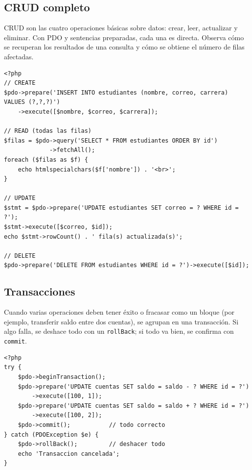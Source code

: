 \documentclass[11pt]{article}
\begin{document}
\subsection{CRUD completo}
CRUD son las cuatro operaciones básicas sobre datos: crear, leer, actualizar y eliminar. Con PDO y sentencias preparadas, cada una es directa. Observa cómo se recuperan los resultados de una consulta y cómo se obtiene el número de filas afectadas.

\begin{cajacodigo}
\begin{lstlisting}[style=php]
<?php
// CREATE
$pdo->prepare('INSERT INTO estudiantes (nombre, correo, carrera) VALUES (?,?,?)')
    ->execute([$nombre, $correo, $carrera]);

// READ (todas las filas)
$filas = $pdo->query('SELECT * FROM estudiantes ORDER BY id')
             ->fetchAll();
foreach ($filas as $f) {
    echo htmlspecialchars($f['nombre']) . '<br>';
}

// UPDATE
$stmt = $pdo->prepare('UPDATE estudiantes SET correo = ? WHERE id = ?');
$stmt->execute([$correo, $id]);
echo $stmt->rowCount() . ' fila(s) actualizada(s)';

// DELETE
$pdo->prepare('DELETE FROM estudiantes WHERE id = ?')->execute([$id]);
\end{lstlisting}
\end{cajacodigo}
\vspace{2pt}
\subsection{Transacciones}
Cuando varias operaciones deben tener éxito o fracasar como un bloque (por ejemplo, transferir saldo entre dos cuentas), se agrupan en una transacción. Si algo falla, se deshace todo con un \texttt{rollBack}; si todo va bien, se confirma con \texttt{commit}.

\begin{cajacodigo}[Transaccion]
\begin{lstlisting}[style=php]
<?php
try {
    $pdo->beginTransaction();
    $pdo->prepare('UPDATE cuentas SET saldo = saldo - ? WHERE id = ?')
        ->execute([100, 1]);
    $pdo->prepare('UPDATE cuentas SET saldo = saldo + ? WHERE id = ?')
        ->execute([100, 2]);
    $pdo->commit();           // todo correcto
} catch (PDOException $e) {
    $pdo->rollBack();         // deshacer todo
    echo 'Transaccion cancelada';
}
\end{lstlisting}
\end{cajacodigo}
\vspace{2pt}
\end{document}
